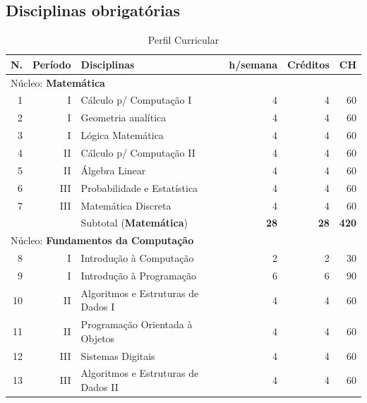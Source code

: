 \documentclass[
	12pt,				%
	openright,			%
  oneside,     %
	a4paper,			%
	english,			%
	french,				%
	spanish,			%
	brazil				%
	]{abntex2}
\begin{document}
\begin{apendicesenv}
\chapter{Disciplinas obrigatórias}
\begin{longtable}{r|r|l|r|r|r}
     \caption{Perfil Curricular}
     \label{ltab:teste}
     \\
\hline
    N.    & Período & Disciplinas                       & h/semana & Créditos & CH \\ \hline
\multicolumn{6}{l}{Núcleo: \textbf{Matemática}}\\                                     \hline 
    1     & I       & Cálculo p/ Computação I           & 4     & 4        & 60 \\ \hline
    2     & I       & Geometria analítica               & 4     & 4        & 60 \\ \hline
    3     & I       & Lógica Matemática                 & 4     & 4        & 60 \\ \hline
    4     & II      & Cálculo p/ Computação II          & 4     & 4     & 60 \\     \hline
    5     & II      & Álgebra Linear                    & 4     & 4     & 60 \\     \hline
    6     & III     & Probabilidade e Estatística       & 4     & 4     & 60 \\     \hline
    7     & III     & Matemática Discreta               & 4     & 4     & 60 \\     \hline
          &         & Subtotal (\textbf{Matemática})    & \textbf{28}    & \textbf{28}    & \textbf{420} \\ \hline
\multicolumn{6}{l}{Núcleo: \textbf{Fundamentos da Computação}} \\ \hline
    8     & I     & Introdução à Computação & 2     & 2     & 30 \\ \hline
    9     & I     & Introdução à Programação & 6     & 6     & 90 \\ \hline
    10    & II    & Algoritmos e Estruturas de Dados I & 4     & 4     & 60 \\ \hline
    11    & II    & Programação Orientada à Objetos & 4     & 4     & 60 \\ \hline
    12    & III   & Sistemas Digitais & 4     & 4     & 60 \\ \hline
    13    & III   & Algoritmos e Estruturas de Dados II & 4     & 4     & 60 \\ \hline

\end{longtable}
\end{apendicesenv}
\end{document}
